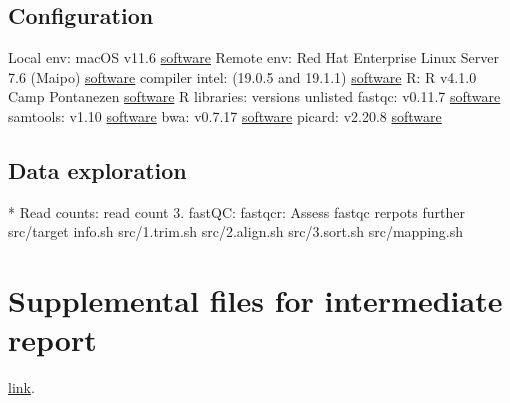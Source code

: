 \markdownRendererUlEndTight \markdownRendererInterblockSeparator
{}\subsection{Configuration}\markdownRendererInterblockSeparator
{}\markdownRendererUlBeginTight
\markdownRendererUlItem Local env: macOS v11.6 \href{https://support.apple.com/macos}{software}\markdownRendererUlItemEnd 
\markdownRendererUlItem Remote env: Red Hat Enterprise Linux Server 7.6 (Maipo) \href{https://www.redhat.com/en/technologies/linux-platforms/enterprise-linux}{software}\markdownRendererUlItemEnd 
\markdownRendererUlItem compiler intel: (19.0.5 and 19.1.1) \href{https://www.intel.com/content/www/us/en/developer/tools/oneapi/commercial-base-hpc.html#gs.ppyt3x}{software}\markdownRendererUlItemEnd 
\markdownRendererUlItem R: R v4.1.0 Camp Pontanezen \href{https://www.r-project.org}{software}\markdownRendererUlItemEnd 
\markdownRendererUlItem R libraries: versions unlisted\markdownRendererUlItemEnd 
\markdownRendererUlItem fastqc: v0.11.7 \href{https://www.bioinformatics.babraham.ac.uk/projects/fastqc/}{software}\markdownRendererUlItemEnd 
\markdownRendererUlItem samtools: v1.10 \href{https://www.htslib.org}{software}\markdownRendererUlItemEnd 
\markdownRendererUlItem bwa: v0.7.17 \href{https://janis.readthedocs.io/en/latest/tools/bioinformatics/bwa/bwamem.html}{software}\markdownRendererUlItemEnd 
\markdownRendererUlItem picard: v2.20.8 \href{http://broadinstitute.github.io/picard/}{software}\markdownRendererUlItemEnd 
\markdownRendererUlEndTight \markdownRendererInterblockSeparator
{}\subsection{Data exploration} * Read counts:\markdownRendererInterblockSeparator
{}read count 3. fastQC:\markdownRendererInterblockSeparator
{}\markdownRendererOlBeginTight
{}fastqcr: Assess fastqc rerpots further\markdownRendererOlItemEnd 
{}src/target info.sh\markdownRendererOlItemEnd 
{}src/1.trim.sh\markdownRendererOlItemEnd 
{}src/2.align.sh\markdownRendererOlItemEnd 
{}src/3.sort.sh\markdownRendererOlItemEnd 
{}src/mapping.sh\markdownRendererOlItemEnd 
\markdownRendererOlEndTight \markdownRendererInterblockSeparator
{}\section{Supplemental files for intermediate report} \href{https://github.com/DylanLawless/kit_assess/data/processed/}{link}.\markdownRendererInterblockSeparator

